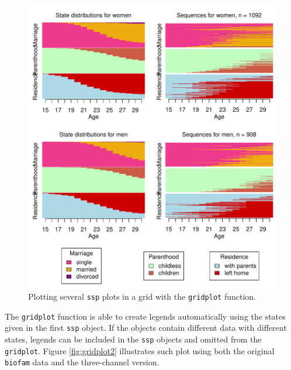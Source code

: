 \documentclass[12pt]{article}\usepackage[]{graphicx}\usepackage[]{color}
\makeatletter
\def\maxwidth{ %
  \ifdim\Gin@nat@width>\linewidth
    \linewidth
  \else
    \Gin@nat@width
  \fi
}
\newenvironment{knitrout}{}{} %
\makeatother
\begin{document}
\begin{knitrout}
\begin{figure}
{\centering \includegraphics[width=\maxwidth]{figure/gridplotfm2-1} 

}

\caption[Plotting several \texttt{ssp} plots in a grid with the \texttt{gridplot} function]{Plotting several \texttt{ssp} plots in a grid with the \texttt{gridplot} function.}\label{fig:gridplotfm2}
\end{figure}


\end{knitrout}


The \texttt{gridplot} function is able to create legends automatically using the states given in the first \texttt{ssp} object. If the objects contain different data with different states, legends can be included in the \texttt{ssp} objects and omitted from the \texttt{gridplot}. Figure \ref{fig:gridplot2} illustrates such plot using both the original \texttt{biofam} data and the three-channel version.
\end{document}
